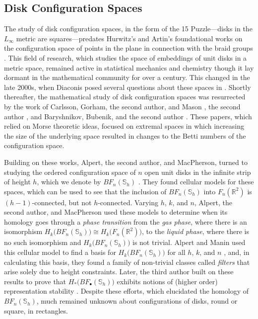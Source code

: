 \documentclass[pagebackref,colorlinks,citecolor=blue,linkcolor=blue,urlcolor=blue,filecolor=blue]{article}
\theoremstyle{definition}\newtheorem{definition}[thm]{Definition}
\theoremstyle{definition}
\newcommand{\R}{\ensuremath{\mathbb{R}}}
\begin{document}
\subsection{Disk Configuration Spaces}

The study of disk configuration spaces, in the form of the 15 Puzzle---disks in the $L_{\infty}$ metric are squares---predates Hurwitz's and Artin's foundational works on the configuration space of points in the plane in connection with the braid groups \cite{hurwitz1891riemann, artin1925theorie, artin1947braids, artin1947theory}.
This field of research, which studies the space of embeddings of unit disks in a metric space, remained active in statistical mechanics and chemistry though it lay dormant in the mathematical community for over a century.
This changed in the late 2000s, when Diaconis posed several questions about these spaces in \cite{diaconis2009markov}.
Shortly thereafter,
the mathematical study of disk configuration spaces was resurrected by the work of Carlsson, Gorham, the second author, and Mason \cite{carlsson2012computational}, the second author \cite{kahle2012sparse}, and Baryshnikov, Bubenik, and the second author \cite{BBK}.
These papers, which relied on Morse theoretic ideas, focused on extremal spaces in which increasing the size of the underlying space resulted in changes to the Betti numbers of the configuration space.

Building on these works, Alpert, the second author, and MacPherson, turned to studying the ordered configuration space of $n$ open unit disks in the infinite strip of height $h$, which we denote by $BF_{n}(\mathbb{S}_{h})$ \cite{alpert2021configuration}.
They found cellular models for these spaces, which can be used to see that the inclusion of $BF_{n}(\mathbb{S}_{h})$ into $F_{n}(\R^{2})$ is $(h-1)$-connected, but not $h$-connected.
Varying $h$, $k$, and $n$, Alpert, the second author, and MacPherson used these models to determine when its homology goes through a \emph{phase transition} from the \emph{gas phase}, where there is an isomorphism $H_{k}\big(BF_{n}(\mathbb{S}_{h})\big)\cong H_{k}\big(F_{n}(\R^{2})\big)$, to the \emph{liquid phase}, where there is no such isomorphism and $H_{k}\big(BF_{n}(\mathbb{S}_{h})\big)$ is not trivial.
Alpert and Manin used this cellular model to find a basis for $H_{k}\big(BF_{n}(\mathbb{S}_{h})\big)$ for all $h$, $k$, and $n$ \cite{alpert2021configuration1}, and, in calculating this basis, they found a family of non-trivial classes called \emph{filters} that arise solely due to height constraints.
Later, the third author built on these results to prove that $H_{*}\big(BF_{\bullet}(\mathbb{S}_{h})\big)$ exhibits notions of (higher order) representation stability \cite{wawrykow2023representation}.
Despite these efforts, which elucidated the homology of $BF_{n}(\mathbb{S}_{h})$, much remained unknown about configurations of disks, round or square, in rectangles.
\end{document}
